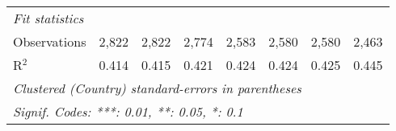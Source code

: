\begin{tabular}{lccccccc}
   \midrule \emph{Fit statistics}\\
   Observations                                                                          & 2,822   & 2,822   & 2,774   & 2,583       & 2,580       & 2,580       & 2,463\\  
   R$^2$                                                                                 & 0.414   & 0.415   & 0.421   & 0.424       & 0.424       & 0.425       & 0.445\\  
   \midrule
   \multicolumn{8}{l}{\emph{Clustered (Country) standard-errors in parentheses}}\\
   \multicolumn{8}{l}{\emph{Signif. Codes: ***: 0.01, **: 0.05, *: 0.1}}\\
\end{tabular}
\par\endgroup


